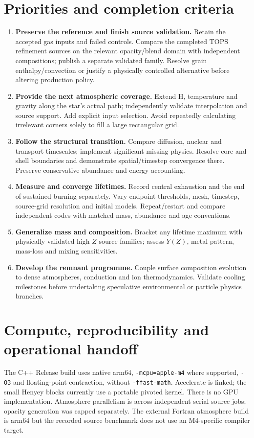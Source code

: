 \documentclass[11pt,letterpaper]{article}
\begin{document}
\section{Priorities and completion criteria}
\begin{enumerate}[label=\textbf{\arabic*.},itemsep=5pt]
\item \textbf{Preserve the reference and finish source validation.} Retain the
accepted gas inputs and failed controls. Compare the completed TOPS refinement
sources on the relevant opacity/blend domain with independent compositions;
publish a separate validated family. Resolve grain enthalpy/convection or
justify a physically controlled alternative before altering production policy.
\item \textbf{Provide the next atmospheric coverage.} Extend H, temperature
and gravity along the star's actual path; independently validate interpolation
and source support. Add explicit input selection. Avoid repeatedly calculating
irrelevant corners solely to fill a large rectangular grid.
\item \textbf{Follow the structural transition.} Compare diffusion, nuclear
and transport timescales; implement significant missing physics. Resolve core
and shell boundaries and demonstrate spatial/timestep convergence there.
Preserve conservative abundance and energy accounting.
\item \textbf{Measure and converge lifetimes.} Record central exhaustion and
the end of sustained burning separately. Vary endpoint thresholds, mesh,
timestep, source-grid resolution and initial models. Repeat/restart and compare
independent codes with matched mass, abundance and age conventions.
\item \textbf{Generalize mass and composition.} Bracket any lifetime maximum
with physically validated high-$Z$ source families; assess $Y(Z)$, metal-pattern,
mass-loss and mixing sensitivities.
\item \textbf{Develop the remnant programme.} Couple surface composition
evolution to dense atmospheres, conduction and ion thermodynamics. Validate
cooling milestones before undertaking speculative environmental or particle
physics branches.
\end{enumerate}

\section{Compute, reproducibility and operational handoff}
The C++ Release build uses native arm64, \texttt{-mcpu=apple-m4}
where supported, \texttt{-O3} and floating-point contraction, without
\texttt{-ffast-math}. Accelerate is linked; the small Henyey blocks currently
use a portable pivoted kernel. There is no GPU implementation. Atmosphere
parallelism is across independent serial source jobs; opacity generation was
capped separately. The external Fortran atmosphere build is arm64 but the
recorded source benchmark does not use an M4-specific compiler target.
\end{document}
